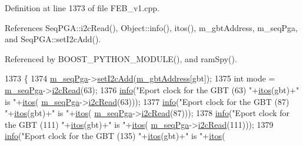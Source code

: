 Definition at line 1373 of file F\+E\+B\+\_\+v1.\+cpp.



References Seq\+P\+G\+A\+::i2c\+Read(), Object\+::info(), itos(), m\+\_\+gbt\+Address, m\+\_\+seq\+Pga, and Seq\+P\+G\+A\+::set\+I2c\+Add().



Referenced by B\+O\+O\+S\+T\+\_\+\+P\+Y\+T\+H\+O\+N\+\_\+\+M\+O\+D\+U\+L\+E(), and ram\+Spy().


\begin{DoxyCode}
1373                                       \{
1374   \hyperlink{classFEB__v1_a6c7804ac86796f233a8393043adf2e77}{m\_seqPga}->\hyperlink{classSeqPGA_a4ef334e4d2cb417b49033dce951728cd}{setI2cAdd}(\hyperlink{classFEB__v1_ac625855df976f16694178f1a4c0eef1e}{m\_gbtAddress}[gbt]);
1375   \textcolor{keywordtype}{int} mode = \hyperlink{classFEB__v1_a6c7804ac86796f233a8393043adf2e77}{m\_seqPga}->\hyperlink{classSeqPGA_a7cd344df2be99f3a02b487f80e87b27e}{i2cRead}(63);
1376   \hyperlink{classObject_a644fd329ea4cb85f54fa6846484b84a8}{info}(\textcolor{stringliteral}{"Eport clock for the GBT (63)  "}+\hyperlink{Tools_8h_af330027dbdafb9a30768b3613c553e60}{itos}(gbt)+\textcolor{stringliteral}{" is "}+\hyperlink{Tools_8h_af330027dbdafb9a30768b3613c553e60}{itos}(
      \hyperlink{classFEB__v1_a6c7804ac86796f233a8393043adf2e77}{m\_seqPga}->\hyperlink{classSeqPGA_a7cd344df2be99f3a02b487f80e87b27e}{i2cRead}(63)));
1377   \hyperlink{classObject_a644fd329ea4cb85f54fa6846484b84a8}{info}(\textcolor{stringliteral}{"Eport clock for the GBT (87)  "}+\hyperlink{Tools_8h_af330027dbdafb9a30768b3613c553e60}{itos}(gbt)+\textcolor{stringliteral}{" is "}+\hyperlink{Tools_8h_af330027dbdafb9a30768b3613c553e60}{itos}(
      \hyperlink{classFEB__v1_a6c7804ac86796f233a8393043adf2e77}{m\_seqPga}->\hyperlink{classSeqPGA_a7cd344df2be99f3a02b487f80e87b27e}{i2cRead}(87)));
1378   \hyperlink{classObject_a644fd329ea4cb85f54fa6846484b84a8}{info}(\textcolor{stringliteral}{"Eport clock for the GBT (111) "}+\hyperlink{Tools_8h_af330027dbdafb9a30768b3613c553e60}{itos}(gbt)+\textcolor{stringliteral}{" is "}+\hyperlink{Tools_8h_af330027dbdafb9a30768b3613c553e60}{itos}(
      \hyperlink{classFEB__v1_a6c7804ac86796f233a8393043adf2e77}{m\_seqPga}->\hyperlink{classSeqPGA_a7cd344df2be99f3a02b487f80e87b27e}{i2cRead}(111)));
1379   \hyperlink{classObject_a644fd329ea4cb85f54fa6846484b84a8}{info}(\textcolor{stringliteral}{"Eport clock for the GBT (135) "}+\hyperlink{Tools_8h_af330027dbdafb9a30768b3613c553e60}{itos}(gbt)+\textcolor{stringliteral}{" is "}+\hyperlink{Tools_8h_af330027dbdafb9a30768b3613c553e60}{itos}(

\end{DoxyCode}
